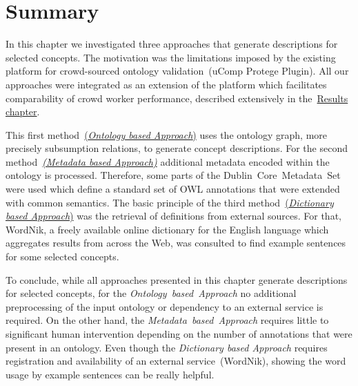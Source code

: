 \section{Summary}\label{sec:approaches_summary}
In this chapter we investigated three approaches that generate descriptions for selected concepts. The motivation was 
the limitations imposed by the existing platform for crowd-sourced ontology validation~(uComp Protege Plugin). All our approaches
were integrated as an extension of the platform which facilitates comparability of crowd worker performance, described extensively in
the~\hyperref[chap:results]{Results chapter}. 

This first method~\hyperref[sec:enrichment_ontology_approach]{(\emph{Ontology based Approach})} uses the ontology graph, more precisely
subsumption relations, to generate concept descriptions. For the second method~\hyperref[sec:enrichment_metaData_approach]{\emph{(Metadata
based Approach)}} additional metadata encoded within the ontology is processed. Therefore, some parts of the Dublin~Core~Metadata~Set were used
which define a standard set of OWL annotations that were extended with common semantics. The basic principle of the third 
method~\hyperref[sec:enrichment_dictionary_approach]{(\emph{Dictionary based Approach})} was the retrieval of definitions from external sources. For that, WordNik, a freely available online dictionary for the English language which aggregates results from across the Web, was consulted to find example sentences for some selected concepts.

To conclude, while all approaches presented in this chapter generate descriptions for selected concepts, for the \emph{Ontology~based~Approach}
no additional preprocessing of the input ontology or dependency to an external service is required. On the other hand, the \emph{Metadata~based~Approach} requires little to significant human intervention depending on the number of annotations that were present in an ontology. Even though the \emph{Dictionary based Approach}
requires registration and availability of an external service~(WordNik), showing the word usage by example sentences can be really helpful.